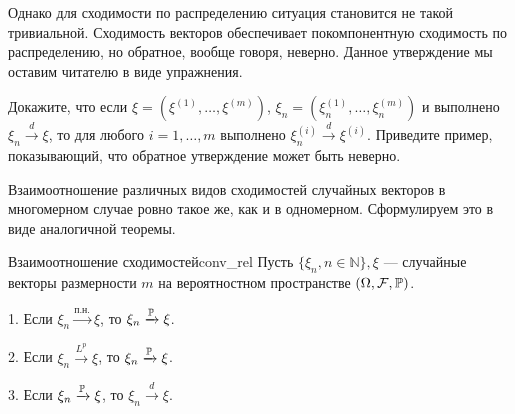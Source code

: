 \vspace{1em}
Однако для сходимости по распределению ситуация становится не такой тривиальной. Сходимость векторов обеспечивает покомпонентную сходимость по распределению, но обратное, вообще говоря, неверно. Данное утверждение мы оставим читателю в виде упражнения.

\begin{remark}[Упражнение 5.1]
    Докажите, что если $\xi = (\xi^{(1)}, \dots, \xi^{(m)})$, $\xi_n = (\xi_n^{(1)}, \dots, \xi_n^{(m)})$ и выполнено $\xi_n \xrightarrow{d} \xi$, то для любого $i = 1, \dots, m$ выполнено $\xi_n^{(i)} \xrightarrow{d} \xi^{(i)}$. Приведите пример, показывающий, что обратное утверждение может быть неверно.
\end{remark}

\vspace{1em}
Взаимоотношение различных видов сходимостей случайных векторов в многомерном случае ровно такое же, как и в одномерном. Сформулируем это в виде аналогичной теоремы.

\vspace{1em}
\begin{theorem}{Взаимоотношение сходимостей}{conv_rel}
    Пусть $\{\xi_n, n \in \mathbb{N}\}, \xi$ --- случайные векторы размерности $m$ на вероятностном пространстве $(\Omega, \mathcal{F}, \P)$.
    
    1. Если $\xi_n \xrightarrow{\text{п.н.}} \xi$, то $\xi_n \xrightarrow{\P} \xi$.
    
    2. Если $\xi_n \xrightarrow{L^p} \xi$, то $\xi_n \xrightarrow{\P} \xi$.
    
    3. Если $\xi_n \xrightarrow{\P} \xi$, то $\xi_n \xrightarrow{d} \xi$.
\end{theorem}

